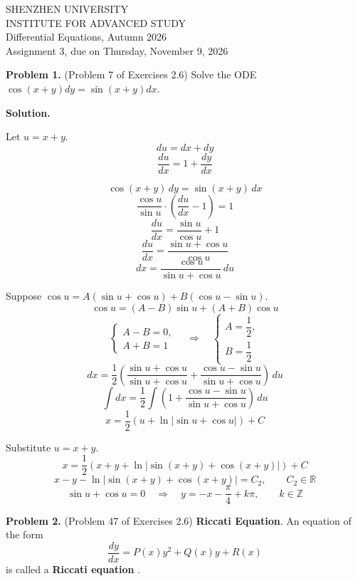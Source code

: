 \documentclass[11pt,a4paper]{article}
\begin{document}
\begin{center}
SHENZHEN UNIVERSITY \\
INSTITUTE FOR ADVANCED STUDY \\
 Differential Equations, Autumn 2026 \\
Assignment 3, due  on Thursday, November 9, 2026
\end{center}


\noindent
{\bf Problem 1.} (Problem 7 of Exercises 2.6)
Solve the ODE $\cos (x+y)dy=\sin (x+y)dx$.
\par\medskip
\noindent\textbf{Solution.}\par
\medskip

Let \(u=x+y\).
\[
du=dx+dy
\]
\[
\frac{du}{dx}=1+\frac{dy}{dx}
\]

\[
\cos(x+y)\,dy=\sin(x+y)\,dx
\]
\[
\frac{\cos u}{\sin u}\cdot
\left(\frac{du}{dx}-1\right)=1
\]
\[
\frac{du}{dx}=\frac{\sin u}{\cos u}+1
\]
\[
\frac{du}{dx}=\frac{\sin u+\cos u}{\cos u}
\]
\[
dx=\frac{\cos u}{\sin u+\cos u}\,du
\]

Suppose \(\cos u=A(\sin u+\cos u)+B(\cos u-\sin u)\).
\[
\cos u=(A-B)\sin u+(A+B)\cos u
\]
\[
\begin{cases}
A-B=0,\\
A+B=1
\end{cases}
\quad\Longrightarrow\quad
\begin{cases}
A=\dfrac12,\\[4pt]
B=\dfrac12
\end{cases}
\]
\[
dx=\frac12\left(
\frac{\sin u+\cos u}{\sin u+\cos u}
+\frac{\cos u-\sin u}{\sin u+\cos u}
\right)\,du
\]
\[
\int dx=\frac12\int\left(
1+\frac{\cos u-\sin u}{\sin u+\cos u}
\right)\,du
\]
\[
x=\frac12\left(u+\ln|\sin u+\cos u|\right)+C
\]

Substitute \(u=x+y\).
\[
x=\frac12\left(
x+y+\ln|\sin(x+y)+\cos(x+y)|
\right)+C
\]
\[
x-y-\ln|\sin(x+y)+\cos(x+y)|=C_2,
\qquad C_2\in\mathbb R
\]
\[
\sin u+\cos u=0
\quad\Longrightarrow\quad
y=-x-\frac{\pi}{4}+k\pi,
\qquad k\in\mathbb Z
\]

\bigskip
\bigskip
\noindent
{\bf Problem 2.} (Problem 47 of Exercises 2.6) {{\bf Riccati Equation}}. An equation of the form
\[
\dfrac{dy}{dx}=P(x)y^2+Q(x)y+R(x)
\]
is called a  {\bf Riccati equation }.
\end{document}
